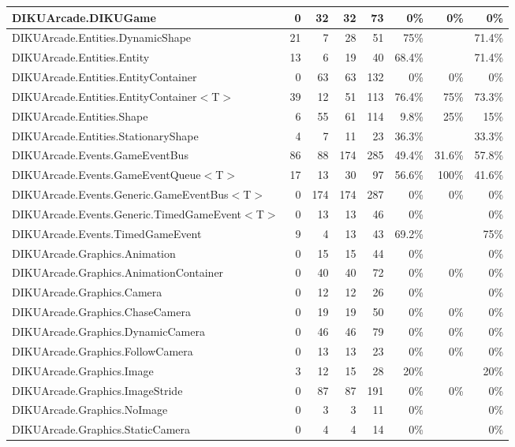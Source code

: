 \documentclass[a4paper,landscape,10pt]{article}
\begin{document}
\begin{longtable}[l]{|l|r|r|r|r|r|r|r|}
\hline
DIKUArcade.DIKUGame & 0 & 32 & 32 & 73 & 0\% & 0\% & 0\%\\
\hline
DIKUArcade.Entities.DynamicShape & 21 & 7 & 28 & 51 & 75\% &  & 71.4\%\\
\hline
DIKUArcade.Entities.Entity & 13 & 6 & 19 & 40 & 68.4\% &  & 71.4\%\\
\hline
DIKUArcade.Entities.EntityContainer & 0 & 63 & 63 & 132 & 0\% & 0\% & 0\%\\
\hline
DIKUArcade.Entities.EntityContainer$<$T$>$ & 39 & 12 & 51 & 113 & 76.4\% & 75\% & 73.3\%\\
\hline
DIKUArcade.Entities.Shape & 6 & 55 & 61 & 114 & 9.8\% & 25\% & 15\%\\
\hline
DIKUArcade.Entities.StationaryShape & 4 & 7 & 11 & 23 & 36.3\% &  & 33.3\%\\
\hline
DIKUArcade.Events.GameEventBus & 86 & 88 & 174 & 285 & 49.4\% & 31.6\% & 57.8\%\\
\hline
DIKUArcade.Events.GameEventQueue$<$T$>$ & 17 & 13 & 30 & 97 & 56.6\% & 100\% & 41.6\%\\
\hline
DIKUArcade.Events.Generic.GameEventBus$<$T$>$ & 0 & 174 & 174 & 287 & 0\% & 0\% & 0\%\\
\hline
DIKUArcade.Events.Generic.TimedGameEvent$<$T$>$ & 0 & 13 & 13 & 46 & 0\% &  & 0\%\\
\hline
DIKUArcade.Events.TimedGameEvent & 9 & 4 & 13 & 43 & 69.2\% &  & 75\%\\
\hline
DIKUArcade.Graphics.Animation & 0 & 15 & 15 & 44 & 0\% &  & 0\%\\
\hline
DIKUArcade.Graphics.AnimationContainer & 0 & 40 & 40 & 72 & 0\% & 0\% & 0\%\\
\hline
DIKUArcade.Graphics.Camera & 0 & 12 & 12 & 26 & 0\% &  & 0\%\\
\hline
DIKUArcade.Graphics.ChaseCamera & 0 & 19 & 19 & 50 & 0\% & 0\% & 0\%\\
\hline
DIKUArcade.Graphics.DynamicCamera & 0 & 46 & 46 & 79 & 0\% & 0\% & 0\%\\
\hline
DIKUArcade.Graphics.FollowCamera & 0 & 13 & 13 & 23 & 0\% & 0\% & 0\%\\
\hline
DIKUArcade.Graphics.Image & 3 & 12 & 15 & 28 & 20\% &  & 20\%\\
\hline
DIKUArcade.Graphics.ImageStride & 0 & 87 & 87 & 191 & 0\% & 0\% & 0\%\\
\hline
DIKUArcade.Graphics.NoImage & 0 & 3 & 3 & 11 & 0\% &  & 0\%\\
\hline
DIKUArcade.Graphics.StaticCamera & 0 & 4 & 4 & 14 & 0\% &  & 0\%\\

\end{longtable}
\end{document}
